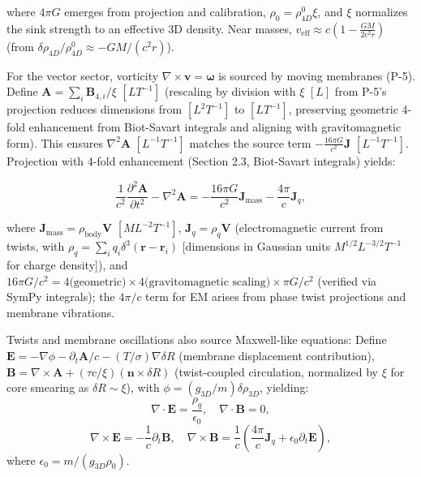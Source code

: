 where $4\pi G$ emerges from projection and calibration, $\rho_0 = \rho_{4D}^0 \xi$, and $\xi$ normalizes the sink strength to an effective 3D density. Near masses, $v_{\text{eff}} \approx c \left(1 - \frac{G M}{2 c^2 r}\right)$ (from $\delta \rho_{4D} / \rho_{4D}^0 \approx - G M / (c^2 r)$).

For the vector sector, vorticity $\nabla \times \mathbf{v} = \boldsymbol{\omega}$ is sourced by moving membranes (P-5). Define $\mathbf{A} = \sum_i \mathbf{B}_{4,i} / \xi$ $[L T^{-1}]$ (rescaling by division with $\xi$ $[L]$ from P-5's projection reduces dimensions from $[L^2 T^{-1}]$ to $[L T^{-1}]$, preserving geometric 4-fold enhancement from Biot-Savart integrals and aligning with gravitomagnetic form). This ensures $\nabla^2 \mathbf{A}$ $[L^{-1} T^{-1}]$ matches the source term $-\frac{16\pi G}{c^2} \mathbf{J}$ $[L^{-1} T^{-1}]$. Projection with 4-fold enhancement (Section 2.3, Biot-Savart integrals) yields:

\begin{equation}
\frac{1}{c^2} \frac{\partial^2 \mathbf{A}}{\partial t^2} - \nabla^2 \mathbf{A} = -\frac{16\pi G}{c^2} \mathbf{J}_{\text{mass}} - \frac{4\pi}{c} \mathbf{J}_q,
\end{equation}

where $\mathbf{J}_{\text{mass}} = \rho_{\text{body}} \mathbf{V}$ $[M L^{-2} T^{-1}]$, $\mathbf{J}_q = \rho_q \mathbf{V}$ (electromagnetic current from twists, with $\rho_q = \sum_i q_i \delta^3(\mathbf{r} - \mathbf{r}_i)$ [dimensions in Gaussian units $M^{1/2} L^{-3/2} T^{-1}$ for charge density]), and $16\pi G/c^2 = 4 \text{(geometric)} \times 4 \text{(gravitomagnetic scaling)} \times \pi G/c^2$ (verified via SymPy integrals); the $4\pi/c$ term for EM arises from phase twist projections and membrane vibrations.

Twists and membrane oscillations also source Maxwell-like equations: Define $\mathbf{E} = -\nabla \phi - \partial_t \mathbf{A}/c - (T/\sigma) \nabla \delta R$ (membrane displacement contribution), $\mathbf{B} = \nabla \times \mathbf{A} + (\tau c / \xi) (\mathbf{n} \times \delta R)$ (twist-coupled circulation, normalized by $\xi$ for core smearing as $\delta R \sim \xi$), with $\phi = (g_{3D} / m) \delta \rho_{3D}$, yielding:
\begin{equation}
\nabla \cdot \mathbf{E} = \frac{\rho_q}{\epsilon_0}, \quad \nabla \cdot \mathbf{B} = 0,
\end{equation}
\begin{equation}
\nabla \times \mathbf{E} = -\frac{1}{c} \partial_t \mathbf{B}, \quad \nabla \times \mathbf{B} = \frac{1}{c} \left( \frac{4\pi}{c} \mathbf{J}_q + \epsilon_0 \partial_t \mathbf{E} \right),
\end{equation}
where $\epsilon_0 = m / (g_{3D} \rho_0)$.

